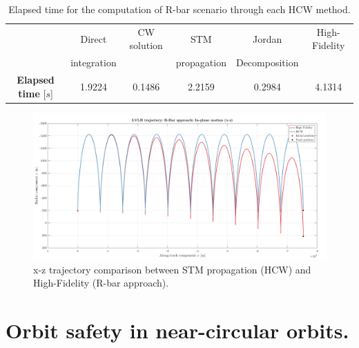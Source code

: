 		\begin{table}[!htb]
		\centering
		\begin{tabular}{|c|c|c|c|c|c|}
		\hline 
		\rowcolor{Gray!10}
		 													& Direct 		& CW solution 		& STM 			& Jordan  			& High-Fidelity \\ 
		\rowcolor{Gray!10} 
		\multirow{-2}{*}{\textbf{Method}}					& integration 	&   				& propagation 	&  Decomposition 	&  \\ 
		\hline 
		\cellcolor{Gray!10} {\textbf{Elapsed time} [$s$]}  	& 1.9224 & 0.1486 & 2.2159 & 0.2984 & 4.1314 \\ 
		\hline 
		\end{tabular} 
		\caption{Elapsed time for the computation of R-bar scenario through each HCW method.}
		\label{tabCh2:HCW_Rbar}
		\end{table}
		\begin{figure}[!htb]
		\begin{changemargin}{-1.3cm}{-1cm}
		\begin{adjustbox}{width=1.1\textwidth}
		\centering\includegraphics[width = \linewidth]{Chapters/Chapter_02/LVLH_trajectory__R_Bar_approach_IP}
		\end{adjustbox}
		\end{changemargin}
		\caption{x-z trajectory comparison between STM propagation (HCW) and High-Fidelity (R-bar approach).}
		\label{figCh2:LVLH_R_bar}
		\end{figure}

\section{Orbit safety in near-circular orbits.}
%
%
